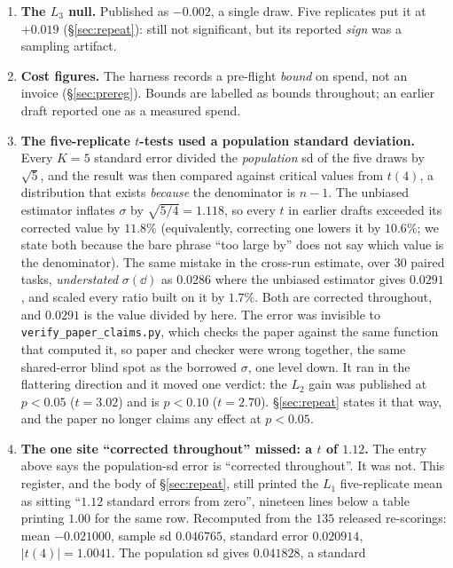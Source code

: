 \documentclass[11pt]{article}
\begin{document}
\begin{enumerate}
    and counting the optimizer's iterations (\S\ref{sec:budgetresult}).
  \item \textbf{The $L_3$ null.} Published as $-0.002$, a single draw. Five replicates put it at
    $+0.019$ (\S\ref{sec:repeat}): still not significant, but its reported \emph{sign} was a
    sampling artifact.
  \item \textbf{Cost figures.} The harness records a pre-flight \emph{bound} on spend, not an
    invoice (\S\ref{sec:prereg}). Bounds are labelled as bounds throughout; an earlier draft
    reported one as a measured spend.
  \item \textbf{The five-replicate $t$-tests used a population standard deviation.} Every
    $K{=}5$ standard error divided the \emph{population} sd of the five draws by $\sqrt{5}$, and
    the result was then compared against critical values from $t(4)$, a distribution that
    exists \emph{because} the denominator is $n-1$. The unbiased estimator inflates $\sigma$ by
    $\sqrt{5/4} = 1.118$, so every $t$ in earlier drafts exceeded its corrected value by
    $11.8\%$ (equivalently, correcting one lowers it by $10.6\%$; we state both because the
    bare phrase ``too large by'' does not say which value is the denominator). The same
    mistake in the cross-run estimate, over $30$ paired tasks, \emph{understated} $\sigma(\dd)$
    as $0.0286$ where the unbiased estimator gives $0.0291$, and scaled every ratio built on it
    by $1.7\%$. Both are corrected throughout, and $0.0291$ is the value divided by here. The
    error was invisible to \texttt{verify\_paper\_claims.py}, which checks the paper against the
    same function that computed it, so paper and checker were wrong together, the same
    shared-error blind spot as the borrowed $\sigma$, one level down.
    It ran in the flattering direction and it moved one verdict: the $L_2$ gain was published at
    $p<0.05$ ($t = 3.02$) and is $p<0.10$ ($t = 2.70$). \S\ref{sec:repeat} states it that way, and
    the paper no longer claims any effect at $p<0.05$.
  \item \textbf{The one site ``corrected throughout'' missed: a $t$ of $1.12$.} The entry above
    says the population-sd error is ``corrected throughout''. It was not. This register, and the
    body of \S\ref{sec:repeat}, still printed the $L_1$ five-replicate mean as sitting ``$1.12$
    standard errors from zero'', nineteen lines below a table printing $1.00$ for the same row.
    Recomputed from the $135$ released re-scorings: mean $-0.021000$, sample sd $0.046765$,
    standard error $0.020914$, $|t(4)| = 1.0041$. The population sd gives $0.041828$, a standard

\end{enumerate}
\end{document}
